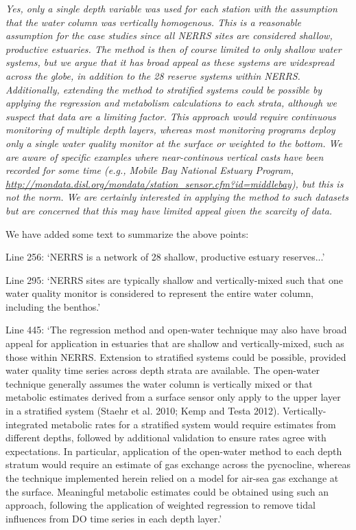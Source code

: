 \documentclass[letterpaper,12pt]{article}\usepackage[]{graphicx}\usepackage[]{color}
\begin{document}
{\it Yes, only a single depth variable was used for each station with the assumption that the water column was vertically homogenous.  This is a reasonable assumption for the case studies since all NERRS sites are considered shallow, productive estuaries.  The method is then of course limited to only shallow water systems, but we argue that it has broad appeal as these systems are widespread across the globe, in addition to the 28 reserve systems within NERRS.  Additionally, extending the method to stratified systems could be possible by applying the regression and metabolism calculations to each strata, although we suspect that data are a limiting factor.  This approach would require continuous monitoring of multiple depth layers, whereas most monitoring programs deploy only a single water quality monitor at the surface or weighted to the bottom.  We are aware of specific examples where near-continous vertical casts have been recorded for some time (e.g., Mobile Bay National Estuary Program, \href{http://mondata.disl.org/mondata/station_sensor.cfm?id=middlebay}{http://mondata.disl.org/mondata/station\_sensor.cfm?id=middlebay}), but this is not the norm.  We are certainly interested in applying the method to such datasets but are concerned that this may have limited appeal given the scarcity of data. 

We have added some text to summarize the above points:

Line 256: `NERRS is a network of 28 shallow, productive estuary reserves...'

Line 295: `NERRS sites are typically shallow and vertically-mixed such that one water quality monitor is considered to represent the entire water column, including the benthos.'

Line 445: `The regression method and open-water technique may also have broad appeal for application in estuaries that are shallow and vertically-mixed, such as those within NERRS.  Extension to stratified systems could be possible, provided water quality time series across depth strata are available.  The open-water technique generally assumes the water column is vertically mixed or that metabolic estimates derived from a surface sensor only apply to the upper layer in a stratified system (Staehr et al. 2010; Kemp and Testa 2012).  Vertically-integrated metabolic rates for a stratified system would require estimates from different depths, followed by additional validation to ensure rates agree with expectations.  In particular, application of the open-water method to each depth stratum would require an estimate of gas exchange across the pycnocline, whereas the technique implemented herein relied on a model for air-sea gas exchange at the surface.  Meaningful metabolic estimates could be obtained using such an approach, following the application of weighted regression to remove tidal influences from DO time series in each depth layer.'   
}
\end{document}

